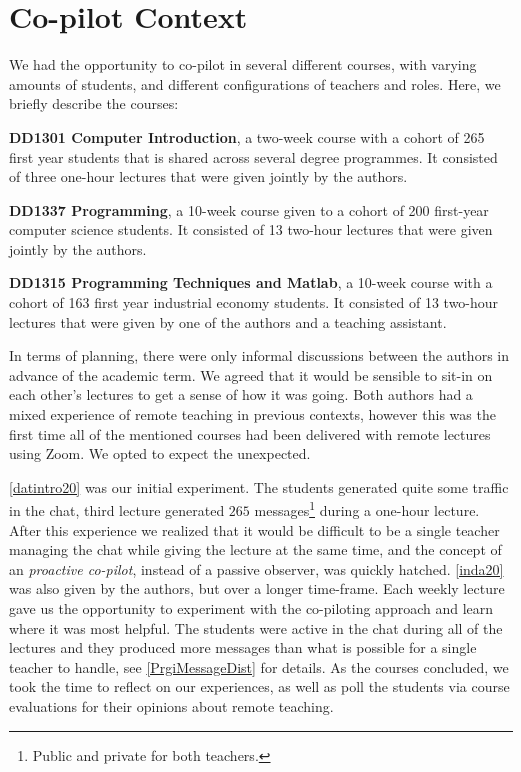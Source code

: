 \documentclass[sigconf,natbib=false]{acmart}
\begin{document}
\section{Co-pilot Context}
We had the opportunity to co-pilot in several different courses, with varying amounts of students, and different configurations of teachers and roles. Here, we briefly describe the courses:

\begin{courses}
  \item\label{datintro20} \textbf{DD1301 Computer Introduction}, a two-week course with a cohort of 265 first year students that is shared across several degree programmes. It consisted of three one-hour lectures that were given jointly by the authors.

  \item\label{inda20} \textbf{DD1337 Programming}, a 10-week course given to a cohort of 200 first-year computer science students. It consisted of 13 two-hour lectures that were given jointly by the authors.

  \item\label{prgi20} \textbf{DD1315 Programming Techniques and Matlab}, a 10-week course with a cohort of 163 first year industrial economy students. It consisted of 13 two-hour lectures that were given by one of the authors and a teaching assistant.
\end{courses}

In terms of planning, there were only informal discussions between the authors in advance of the academic term. We agreed that it would be sensible to sit-in on each other's lectures to get a sense of how it was going. Both authors had a mixed experience of remote teaching in previous contexts, however this was the first time all of the mentioned courses had been delivered with remote lectures using Zoom. We opted to expect the unexpected.

\ref{datintro20} was our initial experiment. The students generated quite some traffic in the chat, \eg third lecture generated $265$ messages\footnote{Public and private for both teachers.} during a one-hour lecture. After this experience we realized that it would be difficult to be a single teacher managing the chat while giving the lecture at the same time, and the concept of an \emph{proactive co-pilot}, instead of a passive observer, was quickly hatched. \ref{inda20} was also given by the authors, but over a longer time-frame. Each weekly lecture gave us the opportunity to experiment with the co-piloting approach and learn where it was most helpful. The students were active in the chat during all of the lectures and they produced more messages than what is possible for a single teacher to handle, see \cref{PrgiMessageDist} for details. As the courses concluded, we took the time to reflect on our experiences, as well as poll the students via course evaluations for their opinions about remote teaching.
\end{document}
